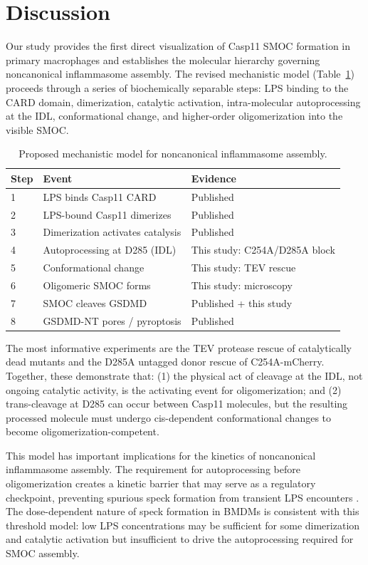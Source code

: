 \documentclass[11pt,a4paper]{article}
\begin{document}
\section{Discussion}

Our study provides the first direct visualization of Casp11 SMOC formation in primary macrophages and establishes the molecular hierarchy governing noncanonical inflammasome assembly. The revised mechanistic model (Table~\ref{tab:model}) proceeds through a series of biochemically separable steps: LPS binding to the CARD domain, dimerization, catalytic activation, intra-molecular autoprocessing at the IDL, conformational change, and higher-order oligomerization into the visible SMOC.

\begin{table}[htbp]
\centering
\caption{Proposed mechanistic model for noncanonical inflammasome assembly.}
\label{tab:model}
\begin{tabular}{lll}
\toprule
\textbf{Step} & \textbf{Event} & \textbf{Evidence} \\
\midrule
1 & LPS binds Casp11 CARD & Published \citep{Shi2014} \\
2 & LPS-bound Casp11 dimerizes & Published \citep{Ross2018} \\
3 & Dimerization activates catalysis & Published \\
4 & Autoprocessing at D285 (IDL) & This study: C254A/D285A block \\
5 & Conformational change & This study: TEV rescue \\
6 & Oligomeric SMOC forms & This study: microscopy \\
7 & SMOC cleaves GSDMD & Published + this study \\
8 & GSDMD-NT pores / pyroptosis & Published \\
\bottomrule
\end{tabular}
\end{table}

The most informative experiments are the TEV protease rescue of catalytically dead mutants and the D285A untagged donor rescue of C254A-mCherry. Together, these demonstrate that: (1) the physical act of cleavage at the IDL, not ongoing catalytic activity, is the activating event for oligomerization; and (2) trans-cleavage at D285 can occur between Casp11 molecules, but the resulting processed molecule must undergo cis-dependent conformational changes to become oligomerization-competent.

This model has important implications for the kinetics of noncanonical inflammasome assembly. The requirement for autoprocessing before oligomerization creates a kinetic barrier that may serve as a regulatory checkpoint, preventing spurious speck formation from transient LPS encounters \citep{Boucher2018, Broz2020}. The dose-dependent nature of speck formation in BMDMs is consistent with this threshold model: low LPS concentrations may be sufficient for some dimerization and catalytic activation but insufficient to drive the autoprocessing required for SMOC assembly.
\end{document}
